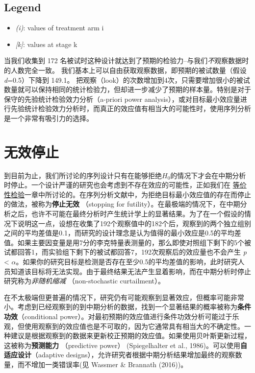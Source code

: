 \documentclass[
  letterpaper,
  DIV=11,
  numbers=noendperiod]{scrreprt}
\providecommand{\tightlist}{%
  \setlength{\itemsep}{0pt}\setlength{\parskip}{0pt}}\usepackage{longtable,booktabs,array}
\begin{document}
\hypertarget{legend-2}{%
\subsection{Legend}\label{legend-2}}

\begin{itemize}
\tightlist
\item
  \emph{(i)}: values of treatment arm i
\item
  \emph{{[}k{]}}: values at stage k
\end{itemize}

当我们收集到 172
名被试时这种设计就达到了预期的检验力--与我们\emph{不}观察数据时的人数完全一致。
我们基本上可以自由获取观察数据，即预期的被试数量（假设\emph{d}=0.5）下降到
149.1。
把观察（look）的次数增加到4次，只需要增加很小的被试数量就可以保持相同的统计检验力，但却进一步减少了预期的样本量。特别是对于保守的先验统计检验效力分析（a-priori
power
analysis），或对目标最小效应量进行先验统计检验效力分析时，而真正的效应值有相当大的可能性时，使用序列分析是一个非常有吸引力的选择。

\hypertarget{ux65e0ux6548ux505cux6b62}{%
\section{无效停止}\label{ux65e0ux6548ux505cux6b62}}

到目前为止，我们所讨论的序列设计只有在能够拒绝\(H_0\)的情况下才会在中期分析时停止。一个设计严谨的研究也会考虑到不存在效应的可能性，正如我们在
\protect\hyperlink{equivalencetest}{等价性检验}一章中所讨论的。在序列分析文献中，为拒绝目标最小效应值的存在而停止的做法，被称为\textbf{停止无效}
（stopping for
futility）。在最极端的情况下，在中期分析之后，也许不可能在最终分析时产生统计学上的显著结果。为了在一个假设的情况下说明这一点，设想在收集了192个观察值中的182个后，观察到的两个独立组别之间的平均差值是0.1，而研究的设计理念是认为值得的最小效应是0.5的平均差值。如果主要因变量是用7分的李克特量表测量的，那么即使对照组下剩下的5个被试都回答1，而实验组下剩下的被试都回答7，192次观察后的效应量也不会产生
\emph{p} \textless{}
\(\alpha\)。如果你的研究目标是检测是否存在至少0.5的平均差值的影响，此时研究人员知道该目标将无法实现。由于最终结果无法产生显着影响，而在中期分析时停止研究称为\emph{非随机缩减}
（non-stochastic curtailment）。

在不太极端但更普遍的情况下，研究仍有可能观察到显著效应，但概率可能非常小。考虑到已经观察到的到中期分析的数据，找到一个显著结果的概率被称为\textbf{条件功效}（conditional
power）。对最初预期的效应值进行条件功效分析可能过于乐观，但使用观察到的效应值也是不可取的，因为它通常具有相当大的不确定性。一种建议是根据观察到的数据来更新校正预期的效应值。如果使用贝叶斯更新过程，这被称为\textbf{预测能力}
（predictive power） (Spiegelhalter et al.,
1986)。可以使用\textbf{自适应设计}（adaptive
designs），允许研究者根据中期分析结果增加最终的观察数量，而不增加一类错误率(见
Wassmer \& Brannath (2016))。
\end{document}
